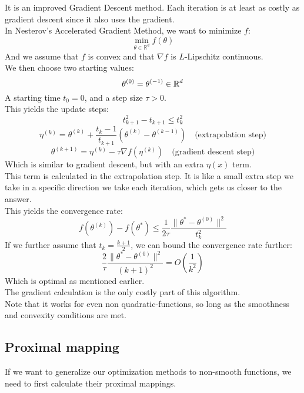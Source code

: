 \documentclass[12pt]{article}
\begin{document}
It is an improved Gradient Descent method.
Each iteration is at least as costly 
as gradient descent
since it also uses the gradient. \\

In Nesterov's Accelerated Gradient
Method, we want to minimize $f$:
\[ \min_{\theta \in \mathbb{R}^d} f(\theta) \]
And we assume that $f$
is convex and that $\nabla f$
is $L$-Lipschitz continuous. \\
We then choose two starting values:
\[ \theta^{(0)} = \theta^{(-1)} \in \mathbb{R}^d \]
A starting time $t_0 = 0$,
and a step size $\tau > 0$. \\
This yields the update steps:
\[ t_{k+1}^2 - t_{k+1} \leq t_k^2 \]
\[ \eta^{(k)} = \theta^{(k)} 
+ \frac{t_k - 1}{t_{k+1}} \left( \theta^{(k)} 
- \theta^{(k-1)} \right) \quad 
\text{(extrapolation step)} \]
\[ \theta^{(k+1)} = \eta^{(k)} - \tau \nabla 
f(\eta^{(k)}) \quad \text{(gradient 
descent step)} \]
Which is similar to gradient descent,
but with an extra $\eta(x)$ term. \\

This term is calculated in the extrapolation 
step. It is like a small extra step
we take in a specific direction
we take each iteration,
which gets us closer to the answer. \\

This yields the convergence rate:
\[ f(\theta^{(k)}) - f(\theta^*) \leq 
\frac{1}{2\tau} \frac{\|\theta^* - 
\theta^{(0)}\|^2}{t_k^2} \]
If we further assume that $t_k = \frac{k+1}{2}$,
we can bound the convergence rate further:
\[ \frac{2}{\tau} \frac{\|\theta^* - 
\theta^{(0)}\|^2}{(k+1)^2} = 
O\left(\frac{1}{k^2}\right) \]
Which is optimal as mentioned earlier. \\

The gradient calculation is the only costly 
part of this algorithm. \\

Note that it works for even non quadratic-functions,
so long as the smoothness and convexity
conditions are met. \\

\newpage

\subsection*{Proximal mapping}

If we want to generalize our optimization
methods to non-smooth functions, we need
to first calculate their proximal mappings. \\
\end{document}
